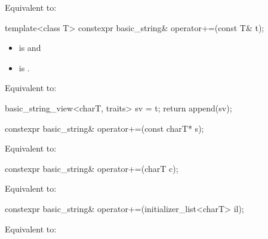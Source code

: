 \begin{itemdescr}
\pnum
\effects
Equivalent to: 
\end{itemdescr}

%
\begin{itemdecl}
template<class T>
  constexpr basic_string& operator+=(const T& t);
\end{itemdecl}

\begin{itemdescr}
\pnum
\constraints
\begin{itemize}
\item
{} is
 and
\item
{} is
.
\end{itemize}

\pnum
\effects
Equivalent to:
\begin{codeblock}
basic_string_view<charT, traits> sv = t;
return append(sv);
\end{codeblock}
\end{itemdescr}

%
\begin{itemdecl}
constexpr basic_string& operator+=(const charT* s);
\end{itemdecl}

\begin{itemdescr}
\pnum
\effects
Equivalent to: 
\end{itemdescr}

%
\begin{itemdecl}
constexpr basic_string& operator+=(charT c);
\end{itemdecl}

\begin{itemdescr}
\pnum
\effects
Equivalent to: 
\end{itemdescr}

%
\begin{itemdecl}
constexpr basic_string& operator+=(initializer_list<charT> il);
\end{itemdecl}

\begin{itemdescr}
\pnum
\effects
Equivalent to: 
\end{itemdescr}


